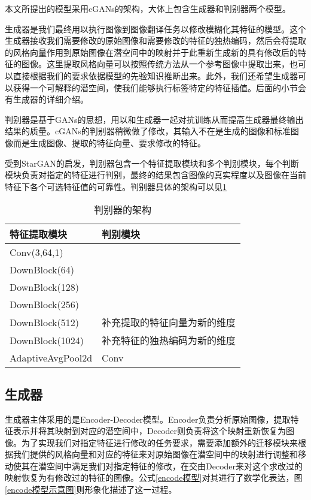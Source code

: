 \documentclass[UTF8,a4paper,12pt]{ctexart}
\numberwithin{equation}{section}
\begin{document}
本文所提出的模型采用cGANs的架构，大体上包含生成器和判别器两个模型。

生成器是我们最终用以执行图像到图像翻译任务以修改模糊化其特征的模型。这个生成器接收我们需要修改的原始图像和需要修改的特征的独热编码，然后会将提取的风格向量作用到原始图像在潜空间中的映射并于此重新生成新的具有修改后的特征的图像。这里提取风格向量可以按照传统方法从一个参考图像中提取出来，也可以直接根据我们的要求依据模型的先验知识推断出来。此外，我们还希望生成器可以获得一个可解释的潜空间，使我们能够执行标签特定的特征插值。后面的小节会有生成器的详细介绍。

判别器是基于GANs的思想，用以和生成器一起对抗训练从而提高生成器最终输出结果的质量。cGANs的判别器稍微做了修改，其输入不在是生成的图像和标准图像而是生成图像、提取的特征向量、要求修改的特征。

受到StarGAN\cite{StarGAN}的启发，判别器包含一个特征提取模块和多个判别模块，每个判断模块负责对指定的特征进行判别，最终的结果包含图像的真实程度以及图像在当前特征下各个可选特征值的可靠性。判别器具体的架构可以见\ref{判别器的架构}

\begin{table}[htbp]
\centering
\caption{判别器的架构}
\label{判别器的架构}
\small
\begin{tabular}{l l}
\toprule
特征提取模块 &判别模块 \\
\midrule
Conv(3,64,1)&\\
DownBlock(64)&\\
DownBlock(128)&\\
DownBlock(256)&\\
DownBlock(512)&补充提取的特征向量为新的维度\\
DownBlock(1024)&补充特征的独热编码为新的维度\\
AdaptiveAvgPool2d&Conv\\
\bottomrule
\end{tabular}
\end{table}

\subsection{生成器}
生成器主体采用的是Encoder-Decoder模型。Encoder负责分析原始图像，提取特征表示并将其映射到对应的潜空间中，Decoder则负责将这个映射重新恢复为图像。为了实现我们对指定特征进行修改的任务要求，需要添加额外的迁移模块来根据我们提供的风格向量和对应的特征来对原始图像在潜空间中的映射进行调整和移动使其在潜空间中满足我们对指定特征的修改，在交由Decoder来对这个求改过的映射恢复为有修改过的特征的图像。公式\ref{encode模型}对其进行了数学化表达，图\ref{encode模型示意图}则形象化描述了这一过程。
\end{document}
